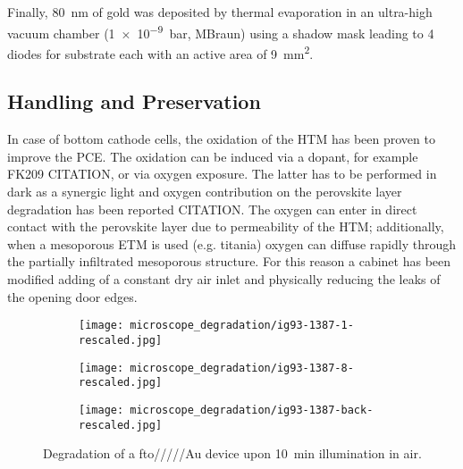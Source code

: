 			Finally, \SI{80}{\nm} of gold was deposited by thermal evaporation in an ultra-high vacuum chamber
			(\SI{1e-9}{\bar}, MBraun) using a shadow mask leading to 4 diodes for substrate each with an active area of
			\SI{9}{\mm\squared}.

	\subsection{Handling and Preservation}
		In case of bottom cathode cells, the oxidation of the HTM has been proven to improve the PCE. The oxidation can be induced via a dopant, for example FK209 CITATION, or via oxygen exposure. The latter has to be performed in dark as a synergic light and oxygen contribution on the perovskite layer degradation has been reported CITATION. The oxygen can enter in direct contact with the perovskite layer due to permeability of the HTM; additionally, when a mesoporous ETM is used (e.g. titania) oxygen can diffuse rapidly through the partially infiltrated mesoporous structure. For this reason a cabinet has been modified adding of a constant dry air inlet and physically reducing the leaks of the opening door edges.
				
		\begin{figure}%
			\centering
			\begin{subfigure}[b]{0.45\textwidth}
				\texttt{[image: microscope\_degradation/ig93-1387-1-rescaled.jpg]}
				\label{fig:microscope_degradation-start}
			\end{subfigure}
			\qquad
			\begin{subfigure}[b]{0.45\textwidth}
				\texttt{[image: microscope\_degradation/ig93-1387-8-rescaled.jpg]}
				\label{fig:microscope_degradation-end_front}
			\end{subfigure}
			\bigskip
			
			\begin{subfigure}[b]{0.45\textwidth}
				\texttt{[image: microscope\_degradation/ig93-1387-back-rescaled.jpg]}
				\label{fig:microscope_degradation-end_back}
			\end{subfigure}
			\caption{Degradation of a \gls{fto}/\dTiOtwo/\mpTiOtwo//\spiro/Au device upon \SI{10}{\minute} illumination in air.}\label{fig:microscope_degradation}
		\end{figure}
	
